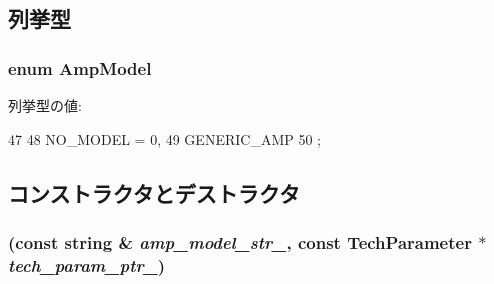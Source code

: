 \subsection{列挙型}
\hypertarget{classAmpUnit_a79e8a1b9fa3eb04d605362bcbdcdc925}{
\subsubsection[{AmpModel}]{\setlength{\rightskip}{0pt plus 5cm}enum {\bf AmpModel}}}
\label{classAmpUnit_a79e8a1b9fa3eb04d605362bcbdcdc925}
\begin{Desc}
\item[列挙型の値: ]\par
\begin{description}
\item[{\em 
\hypertarget{classAmpUnit_a79e8a1b9fa3eb04d605362bcbdcdc925abab57b6e2c553e4d983f415a1f4ea75b}{
NO\_\-MODEL}
\label{classAmpUnit_a79e8a1b9fa3eb04d605362bcbdcdc925abab57b6e2c553e4d983f415a1f4ea75b}
}]\item[{\em 
\hypertarget{classAmpUnit_a79e8a1b9fa3eb04d605362bcbdcdc925acfdc2a079ad70330760f90ae0a0f3040}{
GENERIC\_\-AMP}
\label{classAmpUnit_a79e8a1b9fa3eb04d605362bcbdcdc925acfdc2a079ad70330760f90ae0a0f3040}
}]\end{description}
\end{Desc}




\begin{DoxyCode}
47     {
48       NO_MODEL = 0,
49       GENERIC_AMP
50     };
\end{DoxyCode}


\subsection{コンストラクタとデストラクタ}
\hypertarget{classAmpUnit_abf9c738c7913c61c54b5231167346f60}{
\subsubsection[{AmpUnit}]{ (const string \& {\em amp\_\-model\_\-str\_\-}, \/  const {\bf TechParameter} $\ast$ {\em tech\_\-param\_\-ptr\_\-})}}
\label{classAmpUnit_abf9c738c7913c61c54b5231167346f60}



